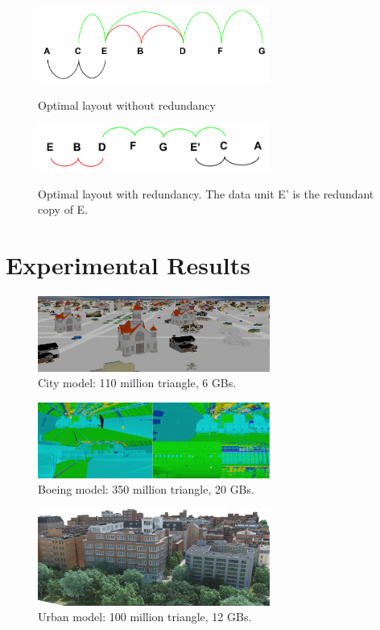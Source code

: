 \documentclass[conference]{acmsiggraph}
\begin{document}
\begin{figure}[ht]
\centering
\includegraphics[width=3in]{examplePic_woRedundancy.png}
\label{woRedundacy}
\caption{Optimal layout without redundancy}
\end{figure}

\begin{figure}[ht]
\centering
\includegraphics[width=3in]{examplePic_withRedundancy.png}
\label{withRedundancy}
\caption{Optimal layout with redundancy. The data unit E' is the redundant copy of E.}
\end{figure} 

\section{Experimental Results}

\begin{figure}[ht]
  \centering
  \includegraphics[width=3.0in]{city.png}
  \caption{City model: 110 million triangle, 6 GBs. }
  \label{fig:model1}
\end{figure}

\begin{figure}[ht]
  \centering
  \includegraphics[width=3.0in]{boeing.jpg}
  \caption{Boeing model: 350 million triangle, 20 GBs. }
  \label{fig:model2}
\end{figure}

\begin{figure}[ht]
  \centering
  \includegraphics[width=3.0in]{densecity.jpg}
  \caption{Urban model: 100 million triangle, 12 GBs. }
  \label{fig:model3}
\end{figure}
\end{document}
